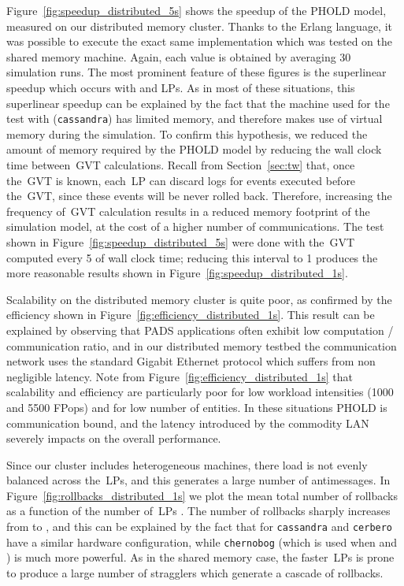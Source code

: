 \documentclass{sigplanconf}
\begin{document}
Figure~\ref{fig:speedup_distributed_5s} shows the speedup of the PHOLD
model, measured on our distributed memory cluster. Thanks to the
Erlang language, it was possible to execute the exact same
implementation which was tested on the shared memory machine. Again,
each value is obtained by averaging 30 simulation runs. The most
prominent feature of these figures is the superlinear speedup which
occurs with  and  \acp{LP}. As in most of these situations,
this superlinear speedup can be explained by the fact that the machine
used for the test with  (\texttt{cassandra}) has limited memory,
and therefore makes use of virtual memory during the simulation. To
confirm this hypothesis, we reduced the amount of memory required by
the PHOLD model by reducing the wall clock time between~\ac{GVT}
calculations. Recall from Section~\ref{sec:tw} that, once the~\ac{GVT}
is known, each~\ac{LP} can discard logs for events executed before
the~\ac{GVT}, since these events will be never rolled back. Therefore,
increasing the frequency of~\ac{GVT} calculation results in a reduced
memory footprint of the simulation model, at the cost of a higher
number of communications. The test shown in
Figure~\ref{fig:speedup_distributed_5s} were done with the~\ac{GVT}
computed every 5 of wall clock time; reducing this interval to 1
produces the more reasonable results shown in
Figure~\ref{fig:speedup_distributed_1s}. 

Scalability on the distributed memory cluster is quite poor, as
confirmed by the efficiency shown in
Figure~\ref{fig:efficiency_distributed_1s}. This result can be
explained by observing that PADS applications often exhibit low
computation / communication ratio, and in our distributed memory
testbed the communication network uses the standard Gigabit Ethernet
protocol which suffers from non negligible latency. Note from
Figure~\ref{fig:efficiency_distributed_1s} that scalability and
efficiency are particularly poor for low workload intensities (1000
and 5500 FPops) and for low number of entities. In these situations
PHOLD is communication bound, and the latency introduced by the
commodity LAN severely impacts on the overall performance.

Since our cluster includes heterogeneous machines, there load is not
evenly balanced across the~\acp{LP}, and this generates a large number
of antimessages. In Figure~\ref{fig:rollbacks_distributed_1s} we plot
the mean total number of rollbacks as a function of the number
of~\acp{LP} . The number of rollbacks sharply increases from 
to , and this can be explained by the fact that for
\verb+cassandra+ and \verb+cerbero+ have a similar hardware configuration,
while \verb+chernobog+ (which is used when  and ) is much
more powerful. As in the shared memory case, the faster~\acp{LP} is
prone to produce a large number of stragglers which generate a cascade
of rollbacks.
\end{document}
